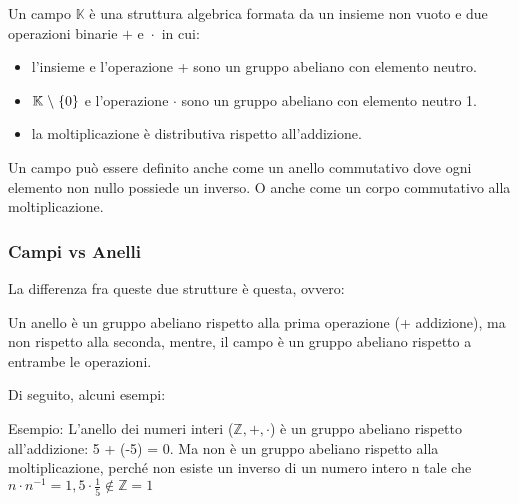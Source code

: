     

\textsf{\small Un campo $\mathbb{K}$ è una struttura algebrica formata da un insieme non vuoto e due operazioni binarie $+ \text{ e } \cdot$ in cui:}

 

\begin{itemize}
	\item \textsf{\small l'insieme e l'operazione + sono un gruppo abeliano con elemento neutro.}
	\item \textsf{\small $\mathbb{K} \hspace{.1cm} \backslash \hspace{.1cm} \{0\}$ e l'operazione $\cdot$ sono un gruppo abeliano con elemento neutro 1.}
	\item \textsf{\small la moltiplicazione è distributiva rispetto all'addizione.}
\end{itemize}

  

\textsf{\small Un campo può essere definito anche come un anello commutativo dove ogni elemento non nullo possiede un inverso.}
\textsf{\small O anche come un corpo commutativo alla moltiplicazione.}

\subsubsection{Campi vs Anelli} 

 

\textsf{\small La differenza fra queste due strutture è questa, ovvero:}


\textsf{\small Un anello è un gruppo abeliano rispetto alla prima operazione (+ addizione), ma non rispetto alla seconda, mentre, il campo è un gruppo abeliano rispetto a entrambe le operazioni.}

\textsf{\small Di seguito, alcuni esempi:}

 

\textsf{\small Esempio: L'anello dei numeri interi ($\mathbb{Z}, +, \cdot$) è un gruppo abeliano rispetto all'addizione: 5 + (-5) = 0. Ma non è un gruppo abeliano rispetto alla moltiplicazione, perché non esiste un inverso di un numero intero n tale che $n \cdot n^{-1} = 1, 5 \cdot \frac{1}{5} \underset{}{\notin \mathbb{Z}} = 1$}

